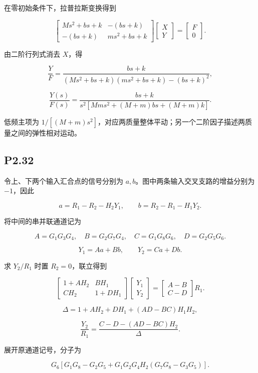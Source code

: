 \documentclass[UTF8,12pt]{ctexart}
\begin{document}
在零初始条件下，拉普拉斯变换得到

\[
\begin{bmatrix}Ms^2+bs+k&-(bs+k)\\-(bs+k)&ms^2+bs+k\end{bmatrix}\begin{bmatrix}X\\Y\end{bmatrix}=\begin{bmatrix}F\\0\end{bmatrix}.
\]

由二阶行列式消去 $X$，得

\[
\frac YF=\frac{bs+k}{(Ms^2+bs+k)(ms^2+bs+k)-(bs+k)^2},
\]

\[
\boxed{\frac{Y(s)}{F(s)}=\frac{bs+k}{s^2\left[Mms^2+(M+m)bs+(M+m)k\right]}}.
\]

低频主项为 $1/[(M+m)s^2]$，对应两质量整体平动；另一个二阶因子描述两质量之间的弹性相对运动。


\subsection*{P2.32}
令上、下两个输入汇合点的信号分别为 $a,b$。图中两条输入交叉支路的增益分别为 $-1$，因此

\[
a=R_1-R_2-H_2Y_1,\qquad b=R_2-R_1-H_1Y_2.
\]

将中间的串并联通道记为

\[
A=G_1G_3G_4,\quad B=G_2G_7G_4,\quad C=G_1G_8G_6,\quad D=G_2G_5G_6.
\]

\[
Y_1=Aa+Bb,\qquad Y_2=Ca+Db.
\]

求 $Y_2/R_1$ 时置 $R_2=0$，联立得到

\[
\begin{bmatrix}1+AH_2&BH_1\\CH_2&1+DH_1\end{bmatrix}\begin{bmatrix}Y_1\\Y_2\end{bmatrix}=\begin{bmatrix}A-B\\C-D\end{bmatrix}R_1.
\]

\[
\Delta=1+AH_2+DH_1+(AD-BC)H_1H_2,
\]

\[
\boxed{\frac{Y_2}{R_1}=\frac{C-D-(AD-BC)H_2}{\Delta}}.
\]

展开原通道记号，分子为

\[
G_6\left[G_1G_8-G_2G_5+G_1G_2G_4H_2(G_7G_8-G_3G_5)\right].
\]
\end{document}

